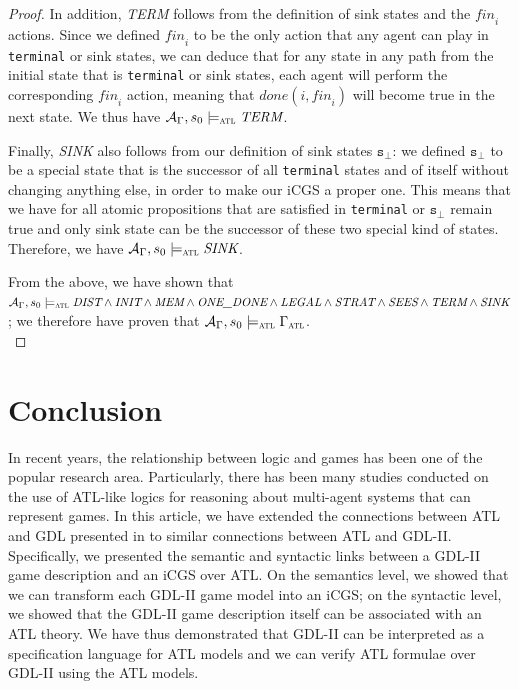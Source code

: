 \documentclass{article}
\theoremstyle{theorem}
\theoremstyle{lemma}
\theoremstyle{definition}
\theoremstyle{remark}
\begin{document}
\begin{proof}
    \par In addition, \textit{TERM} follows from the definition of sink states and the $\textit{fin}_i$ actions. Since we defined $\textit{fin}_i$ to be the only action that any agent can play in \texttt{terminal} or sink states, we can deduce that for any state in any path from the initial state that is \texttt{terminal} or sink states, each agent will perform the corresponding $\textit{fin}_i$ action, meaning that $done(i, \textit{fin}_i)$ will become true in the next state. We thus have $\mathcal{A}_\Gamma, s_0 \models_\textsc{atl} \textit{TERM}$.
    \par Finally, \textit{SINK} also follows from our definition of sink states $\texttt{s}_\bot$: we defined $\texttt{s}_\bot$ to be a special state that is the successor of all \texttt{terminal} states and of itself without changing anything else, in order to make our iCGS a proper one. This means that we have for all atomic propositions that are satisfied in \texttt{terminal} or $\texttt{s}_\bot$ remain true and only sink state can be the successor of these two special kind of states. Therefore, we have $\mathcal{A}_\Gamma, s_0 \models_\textsc{atl} \textit{SINK}$.
    \par From the above, we have shown that $\mathcal{A}_\Gamma, s_0 \models_\textsc{atl} \textit{DIST} \wedge \textit{INIT} \wedge \textit{MEM} \wedge \textit{ONE\_DONE} \wedge \textit{LEGAL} \wedge \textit{STRAT} \wedge \textit{SEES} \wedge \textit{TERM} \wedge \textit{SINK}$; we therefore have proven that $\mathcal{A}_\Gamma, s_0 \models_\textsc{atl} \Gamma_\textsc{atl}$. \\
\end{proof}



\section{Conclusion}
\par In recent years, the relationship between logic and games has been one of the popular research area. Particularly, there has been many studies conducted on the use of ATL-like logics for reasoning about multi-agent systems that can represent games. In this article, we have extended the connections between ATL and GDL presented in \citep{GDLpaper} to similar connections between ATL and GDL-II. Specifically, we presented the semantic and syntactic links between a GDL-II game description and an iCGS over ATL. On the semantics level, we showed that we can transform each GDL-II game model into an iCGS; on the syntactic level, we showed that the GDL-II game description itself can be associated with an ATL theory. We have thus demonstrated that GDL-II can be interpreted as a specification language for ATL models and we can verify ATL formulae over GDL-II using the ATL models.
\end{document}
